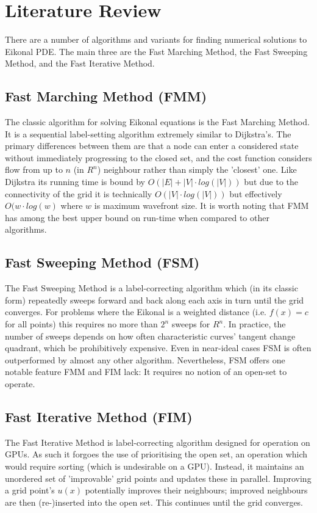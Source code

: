 \documentclass[11pt]{article}       %
\begin{document}
\section{Literature Review} \label{sec:lit_review}

There are a number of algorithms and variants for finding numerical solutions to Eikonal PDE. The main three are the Fast Marching Method\cite{sethian1996fast}, the Fast Sweeping Method\cite{zhao2005fast}, and the Fast Iterative Method\cite{jeong2008fast}.

\subsection{Fast Marching Method (FMM)}\label{sec:FMM}
The classic algorithm for solving Eikonal equations is the Fast Marching Method\cite{tsitsiklis1995efficient}\cite{sethian1996fast}. It is a sequential label-setting algorithm extremely similar to Dijkstra's. The primary differences between them are that a node can enter a considered state without immediately progressing to the closed set, and the cost function considers flow from up to $n$ (in $R^n$) neighbour rather than simply the 'closest' one. Like Dijkstra its running time is bound by $O(|E| + |V| \cdot log(|V|))$ but due to the connectivity of the grid it is technically $O(|V| \cdot log(|V|))$ but effectively $O(w \cdot log(w)$ where $w$ is maximum wavefront size. It is worth noting that FMM has among the best upper bound on run-time when compared to other algorithms.

\subsection{Fast Sweeping Method (FSM)}\label{sec:FSM}
The Fast Sweeping Method is a label-correcting algorithm which (in its classic form) repeatedly sweeps forward and back along each axis in turn until the grid converges. For problems where the Eikonal is a weighted distance (i.e. $f(x) = c$ for all points) this requires no more than $2^n$ sweeps for $R^n$. In practice, the number of sweeps depends on how often characteristic curves' tangent change quadrant, which be prohibitively expensive. Even in near-ideal cases FSM is often outperformed by almost any other algorithm.\cite{jeong2008fast}\cite{gomez2015fast} Nevertheless, FSM offers one notable feature FMM and FIM lack: It requires no notion of an open-set to operate.

\subsection{Fast Iterative Method (FIM)}\label{sec:FIM}
The Fast Iterative Method is label-correcting algorithm designed for operation on GPUs. As such it forgoes the use of prioritising the open set, an operation which would require sorting (which is undesirable on a GPU). Instead, it maintains an unordered set of 'improvable' grid points and updates these in parallel. Improving a grid point's $u(x)$ potentially improves their neighbours; improved neighbours are then (re-)inserted into the open set. This continues until the grid converges.
\end{document}

